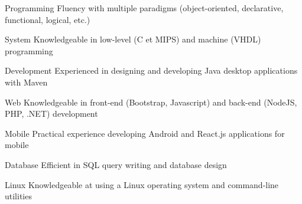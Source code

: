 

\begin{cvskills}

  \cvskill
    {Programming} %
    {Fluency with multiple paradigms (object-oriented, declarative, functional, logical, etc.)}

  \cvskill
    {System} %
    {Knowledgeable in low-level (C et MIPS) and machine (VHDL) programming}

  \cvskill
    {Development} %
    {Experienced in designing and developing Java desktop applications with Maven}
    
  \cvskill
    {Web} %
    {Knowledgeable in front-end (Bootstrap, Javascript) and back-end (NodeJS, PHP, .NET) development}
  
  \cvskill
    {Mobile} %
    {Practical experience developing Android and React.js applications for mobile}
    
  \cvskill
    {Database} %
    {Efficient in SQL query writing and database design}
    
  \cvskill
    {Linux} %
    {Knowledgeable at using a Linux operating system and command-line utilities}

\end{cvskills}
